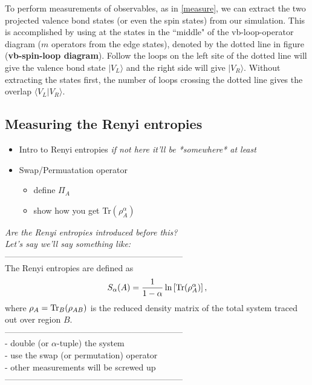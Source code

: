 \documentclass[prb,aps,twocolumn,floatfix,amsmath,amssymb,superscriptaddress,tightenlines]{revtex4}
\begin{document}
To perform measurements of observables, as in \eqref{measure}, we can extract the two projected valence bond states (or even the spin states) from our simulation.  
This  is accomplished by using at the states in the ``middle" of the vb-loop-operator diagram ($m$ operators from the edge states), denoted by the dotted line in figure ({\bf \!vb-spin-loop diagram}).
Follow the loops on the left site of the dotted line will give the valence bond state $\lvert V_L \rangle$ and the right side will give $\lvert V_R \rangle$.
Without extracting the states first, the number of loops crossing the dotted line gives the overlap $\langle V_L \lvert V_R \rangle $.

\subsection{Measuring the Renyi entropies}

\noindent
\begin{itemize}
\item{Intro to Renyi entropies {\it if not here it'll be *somewhere* at least}}
\item{Swap/Permuatation operator}
	\begin{itemize}
	\item{define $\Pi_A$}
	\item{show how you get Tr$(\rho_A^{\alpha})$}
	\end{itemize}
\end{itemize}

{\it Are the Renyi entropies introduced before this?}\\ 
{\it Let's say we'll say something like:}\\
---------------------------------------------------------------\\
The Renyi entropies are defined as 
\begin{equation} \label{renyi}
S_{\alpha}(A) = \frac{1}{1-\alpha}\ln \left[ {\rm Tr}(\rho_A^{\alpha}) \right],
\end{equation}
where $\rho_A = {\rm Tr}_B (\rho_{AB})$ is the reduced density matrix of the total system traced out over region $B$.\\
---------------------------------------------------------------\\
\noindent
- {double (or $\alpha$-tuple) the system}\\
- {use the swap (or permutation) operator}\\
- {other measurements will be screwed up} \\
---------------------------------------------------------------\\
\end{document}
